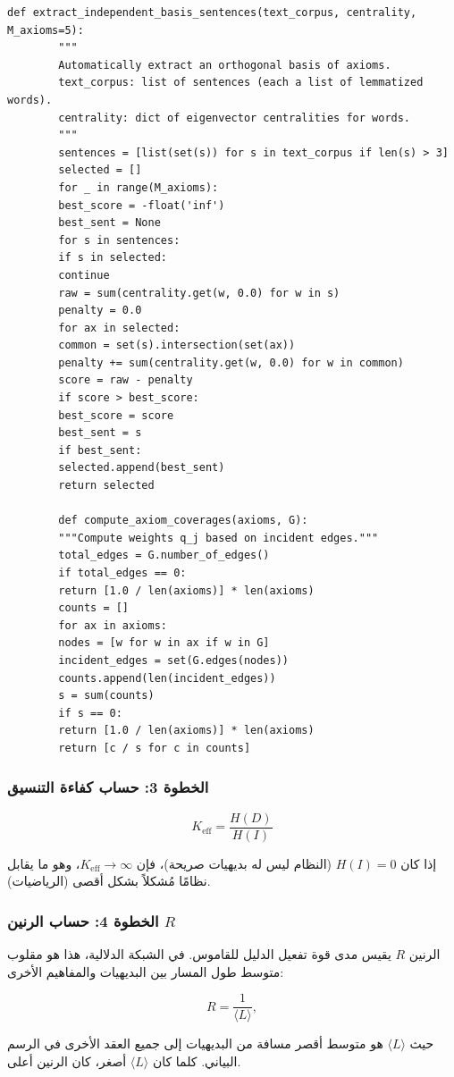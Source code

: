 \documentclass[11pt,a4paper]{article}
\begin{document}
	\begin{lstlisting}[caption={دالة استخراج الأساس البديهي المستقل}, label={lst:basis}]
		def extract_independent_basis_sentences(text_corpus, centrality, M_axioms=5):
		"""
		Automatically extract an orthogonal basis of axioms.
		text_corpus: list of sentences (each a list of lemmatized words).
		centrality: dict of eigenvector centralities for words.
		"""
		sentences = [list(set(s)) for s in text_corpus if len(s) > 3]
		selected = []
		for _ in range(M_axioms):
		best_score = -float('inf')
		best_sent = None
		for s in sentences:
		if s in selected:
		continue
		raw = sum(centrality.get(w, 0.0) for w in s)
		penalty = 0.0
		for ax in selected:
		common = set(s).intersection(set(ax))
		penalty += sum(centrality.get(w, 0.0) for w in common)
		score = raw - penalty
		if score > best_score:
		best_score = score
		best_sent = s
		if best_sent:
		selected.append(best_sent)
		return selected
		
		def compute_axiom_coverages(axioms, G):
		"""Compute weights q_j based on incident edges."""
		total_edges = G.number_of_edges()
		if total_edges == 0:
		return [1.0 / len(axioms)] * len(axioms)
		counts = []
		for ax in axioms:
		nodes = [w for w in ax if w in G]
		incident_edges = set(G.edges(nodes))
		counts.append(len(incident_edges))
		s = sum(counts)
		if s == 0:
		return [1.0 / len(axioms)] * len(axioms)
		return [c / s for c in counts]
	\end{lstlisting}
	
	\subsubsection{الخطوة 3: حساب كفاءة التنسيق}
	
	\[
	\boxed{
		K_{\mathrm{eff}} = \frac{H(D)}{H(I)}
	}
	\]
	
	إذا كان \(H(I) = 0\) (النظام ليس له بديهيات صريحة)، فإن \(K_{\mathrm{eff}} \to \infty\)، وهو ما يقابل نظامًا مُشكلاً بشكل أقصى (الرياضيات).
	
	\subsubsection{الخطوة 4: حساب الرنين \(R\)}
	
	الرنين \(R\) يقيس مدى قوة تفعيل الدليل للقاموس. في الشبكة الدلالية، هذا هو مقلوب متوسط طول المسار بين البديهيات والمفاهيم الأخرى:
	
	\[
	R = \frac{1}{\langle L \rangle},
	\]
	
	حيث \(\langle L \rangle\) هو متوسط أقصر مسافة من البديهيات إلى جميع العقد الأخرى في الرسم البياني. كلما كان \(\langle L \rangle\) أصغر، كان الرنين أعلى.
	
\end{document}
